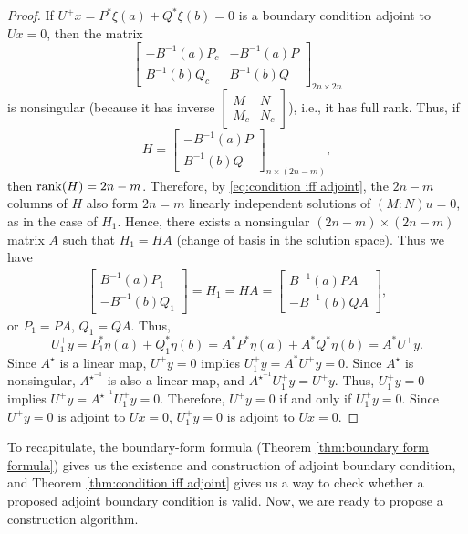 \documentclass[11pt, oneside, a4paper]{article}
\begin{document}
\begin{proof}
    If $U^+x=P^*\xi(a) + Q^*\xi(b)=0$ is a boundary condition adjoint to $Ux=0$, then the matrix
    \[\begin{bmatrix}
        -B^{-1}(a)P_c & -B^{-1}(a)P\\
        B^{-1}(b)Q_c & B^{-1}(b)Q
    \end{bmatrix}_{2n\times 2n}\]
is nonsingular (because it has inverse $\begin{bmatrix}M & N\\ M_c & N_c\end{bmatrix}$), i.e., it has full rank. Thus, if 
    \[H = \begin{bmatrix}
        -B^{-1}(a)P\\
        B^{-1}(b)Q
    \end{bmatrix}_{n\times (2n-m)},\]
    then $\operatorname{rank}(H)=2n-m$. Therefore, by \eqref{eq:condition iff adjoint}, the $2n-m$ columns of $H$ also form $2n=m$ linearly independent solutions of $(M:N)u=0$, as in the case of $H_1$. Hence, there exists a nonsingular $(2n-m)\times (2n-m)$ matrix $A$ such that $H_1=HA$ (change of basis in the solution space). 
    Thus we have
    \begin{align*}
        \begin{bmatrix}
            B^{-1}(a)P_1\\
            -B^{-1}(b)Q_1
        \end{bmatrix} = H_1 = HA = \begin{bmatrix}
            B^{-1}(a)PA\\
            -B^{-1}(b)QA
        \end{bmatrix},
    \end{align*}
    or $P_1=PA$, $Q_1=QA$. Thus, 
    \[U_1^+y = P_1^*\eta(a) + Q_1^*\eta(b) = A^*P^*\eta(a) + A^*Q^*\eta(b)= A^* U^+y.\]
    Since $A^\star$ is a linear map, $U^+y=0$ implies $U_1^+y=A^*U^+y=0$. Since $A^\star$ is nonsingular, $A^{\star^{-1}}$ is also a linear map, and $A^{\star^{-1}}U_1^+y = U^+y$. Thus, $U_1^+y=0$ implies $U^+y=A^{\star^{-1}}U_1^+y=0$. Therefore, $U^+y=0$ if and only if $U_1^+y=0$. Since $U^+y=0$ is adjoint to $Ux=0$, $U_1^+y=0$ is adjoint to $Ux=0$.
\end{proof}

To recapitulate, the boundary-form formula (Theorem \ref{thm:boundary form formula}) gives us the existence and construction of adjoint boundary condition, and Theorem \ref{thm:condition iff adjoint} gives us a way to check whether a proposed adjoint boundary condition is valid. Now, we are ready to propose a construction algorithm.
\end{document}
